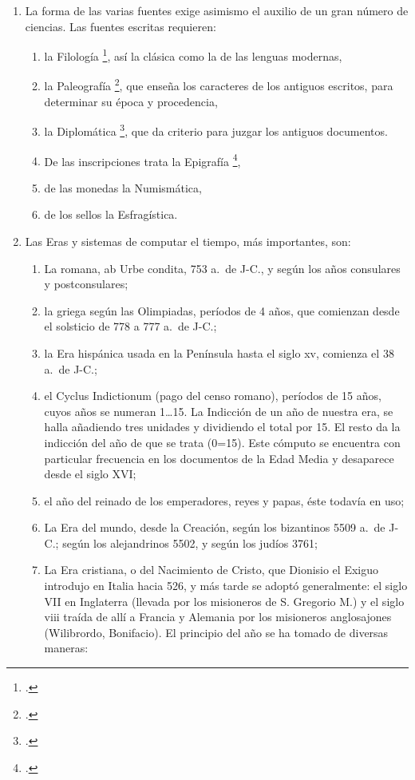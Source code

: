\raggedbottom{} \documentclass[12pt, a4paper, openany]{book} %
\begin{document}
\begin{enumerate}
\begin{enumerate}
        \end{enumerate}
  \item La forma de las varias fuentes exige asimismo el auxilio de un gran número de ciencias. Las fuentes escritas requieren:\@ \begin{enumerate}
          \item la Filología \footcite{Stephanus1831Thesaurus}, así la clásica como la de las lenguas modernas,
          \item la Paleografía \footcite{Silvestre1839Paleographie}, que enseña los caracteres de los antiguos escritos, para determinar su época y procedencia,
          \item la Diplomática \footcite{Mabillon1681DeReDiplomatica}, que da criterio para juzgar los antiguos documentos.
          \item De las inscripciones trata la Epigrafía \footcite{Rossi1890Introductio},
          \item de las monedas la Numismática,
          \item de los sellos la Esfragística.
        \end{enumerate}
  \item Las Eras y sistemas de computar el tiempo, más importantes, son:\@ \begin{enumerate}
          \item La romana, ab Urbe condita, 753 a.\ de J-C., y según los años consulares y postconsulares;
          \item la griega según las Olimpiadas, períodos de 4 años, que comienzan desde el solsticio de 778 a 777 a.\ de J-C.;
          \item la Era hispánica usada en la Península hasta el siglo xv, comienza el 38 a.\ de J-C.;
          \item el Cyclus Indictionum (pago del censo romano), períodos de 15 años, cuyos años se numeran 1\ldots 15. La Indicción de un año de nuestra era, se halla añadiendo tres unidades y dividiendo el total por 15. El resto da la indicción del año de que se trata (0=15). Este cómputo se encuentra con particular frecuencia en los documentos de la Edad Media y desaparece desde el siglo XVI;\@
          \item el año del reinado de los emperadores, reyes y papas, éste todavía en uso;
          \item La Era del mundo, desde la Creación, según los bizantinos 5509 a.\ de J-C.; según los alejandrinos 5502, y según los judíos 3761;
          \item La Era cristiana, o del Nacimiento de Cristo, que Dionisio el Exiguo introdujo en Italia hacia 526, y más tarde se adoptó generalmente: el siglo VII en Inglaterra (llevada por los misioneros de S. Gregorio M.) y el siglo viii traída de allí a Francia y Alemania por los misioneros anglosajones (Wilibrordo, Bonifacio). El principio del año se ha tomado de diversas maneras: \begin{enumerate}

\end{enumerate}
\end{enumerate}
\end{enumerate}
\end{document}
